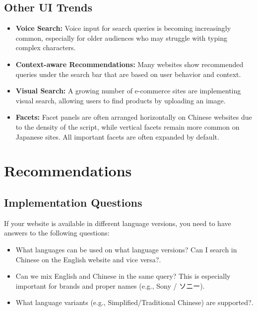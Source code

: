 \documentclass[11pt]{article}
\begin{document}
\subsection{Other UI Trends}
\begin{itemize}
    \item \textbf{Voice Search:} Voice input for search queries is becoming increasingly common, especially for older audiences who may struggle with typing complex characters.
    \item \textbf{Context-aware Recommendations:} Many websites show recommended queries under the search bar that are based on user behavior and context.
    \item \textbf{Visual Search:} A growing number of e-commerce sites are implementing visual search, allowing users to find products by uploading an image.
    \item \textbf{Facets:} Facet panels are often arranged horizontally on Chinese websites due to the density of the script, while vertical facets remain more common on Japanese sites. All important facets are often expanded by default.
\end{itemize}

\section{Recommendations}
\subsection{Implementation Questions}
If your website is available in different language versions, you need to have answers to the following questions:
\begin{itemize}
    \item What languages can be used on what language versions? Can I search in Chinese on the English website and vice versa?.
    \item Can we mix English and Chinese in the same query? This is especially important for brands and proper names (e.g., Sony / ソニー).
    \item What language variants (e.g., Simplified/Traditional Chinese) are supported?.
\end{itemize}
\end{document}
